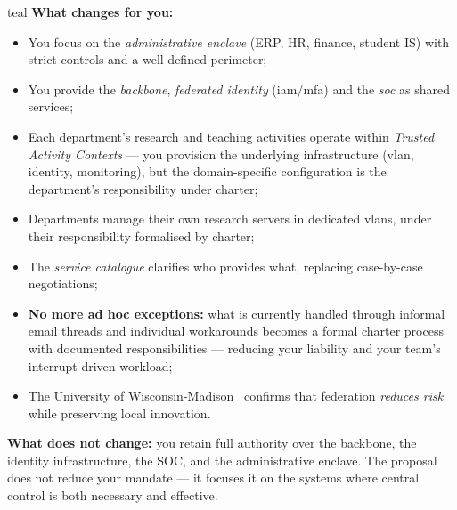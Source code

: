 \begin{stakeholderbox}{teal}
\medskip
\textbf{What changes for you:}
\begin{itemize}[nosep]
    \item You focus on the \emph{administrative enclave} (ERP,
    HR, finance, student IS) with strict controls and a well-defined
    perimeter;
    \item You provide the \emph{backbone}, \emph{federated identity}
    (\gls{iam}/\gls{mfa}) and the \emph{\gls{soc}} as shared services;
    \item Each department's research and teaching activities
    operate within \emph{Trusted Activity Contexts} --- you
    provision the underlying infrastructure (\gls{vlan}, identity,
    monitoring), but the domain-specific configuration is the
    department's responsibility under charter;
    \item Departments manage their own research servers in
    dedicated \gls{vlan}s, under their responsibility formalised by charter;
    \item The \emph{service catalogue} clarifies who provides what,
    replacing case-by-case negotiations;
    \item \textbf{No more ad hoc exceptions:} what is currently
    handled through informal email threads and individual
    workarounds becomes a formal charter process with documented
    responsibilities --- reducing your liability and your team's
    interrupt-driven workload;
    \item The University of Wisconsin-Madison~\cite{uw-madison} confirms
    that federation \emph{reduces risk} while preserving
    local innovation.
\end{itemize}

\medskip
\textbf{What does not change:} you retain full authority over
the backbone, the identity infrastructure, the SOC, and the
administrative enclave. The proposal does not reduce your
mandate --- it focuses it on the systems where central control
is both necessary and effective.
\end{stakeholderbox}

\bigskip

